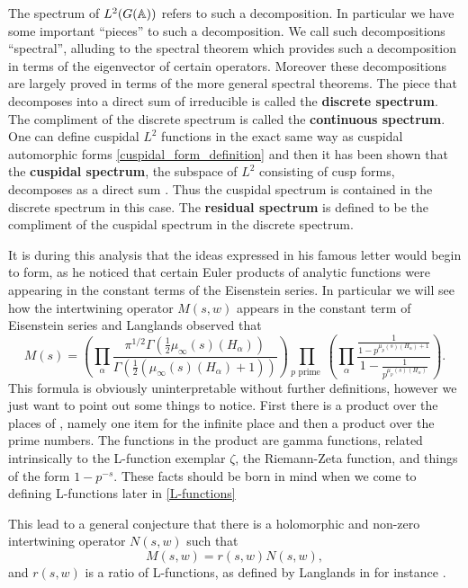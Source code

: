 The spectrum of \(L^2(G(\A))\) refers to such a decomposition. In particular we have some important ``pieces'' to such a decomposition. We call such decompositions ``spectral'', alluding to the spectral theorem which provides such a decomposition in terms of the eigenvector of certain operators. Moreover these decompositions are largely proved in terms of the more general spectral theorems. The piece that decomposes into a direct sum of irreducible is called the \textbf{discrete spectrum}. The compliment of the discrete spectrum is called the \textbf{continuous spectrum}. One can define cuspidal \(L^2\) functions in the exact same way as cuspidal automorphic forms \ref{cuspidal_form_definition} and then it has been shown that the \textbf{cuspidal spectrum}, the subspace of \(L^2\) consisting of cusp forms, decomposes as a direct sum \cite[9]{getzIntroductionAutomorphicRepresentations2024}. Thus the cuspidal spectrum is contained in the discrete spectrum in this case. The \textbf{residual spectrum} is defined to be the compliment of the cuspidal spectrum in the discrete spectrum. 

It is during this analysis that the ideas expressed in his famous letter \cite{langlandsLetterAndreWeil1967} would begin to form, as he noticed that certain Euler products of analytic functions were appearing in the constant terms of the Eisenstein series. In particular we will see how the intertwining operator \(M(s, w)\) appears in the constant term of Eisenstein series and Langlands observed that \cite{langlandsEulerProducts1971} 
\[M(s) = \left( \prod_\alpha\frac{\pi^{1/2}\Gamma(\frac{1}{2}\mu_\infty(s)(H_\alpha))}{\Gamma(\frac{1}{2}(\mu_\infty(s)(H_\alpha) + 1))} \right)\prod_{p \text{ prime }} \left( \prod_\alpha \frac{\frac{1}{1 - p^{\mu_p(s)(H_\alpha) + 1}}}{1 - \frac{1}{p^{\mu_p(s)(H_\alpha) }}}\right).\]
This formula is obviously uninterpretable without further definitions, however we just want to point out some things to notice. First there is a product over the places of \Q, namely one item for the infinite place and then a product over the prime numbers. The functions in the product are gamma functions, related intrinsically to the L-function exemplar \(\zeta\), the Riemann-Zeta function, and things of the form \(1 - p^{-s}\). These facts should be born in mind when we come to defining L-functions later in \ref{L-functions}

This lead to a general conjecture that there is a holomorphic and non-zero intertwining operator \(N(s, w)\) such that 
\[M(s, w) = r(s, w)N(s,w),\]
and \(r(s, w)\) is a ratio of L-functions, as defined by Langlands in for instance \cite{langlandsEulerProducts1971}.

